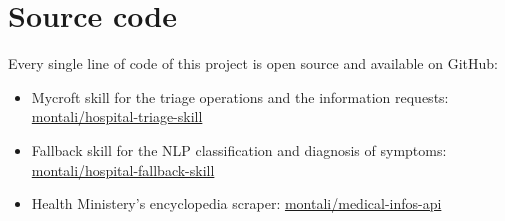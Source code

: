 \documentclass[conference]{IEEEtran}
\begin{document}
\section{Source code}
Every single line of code of this project is open source and available on GitHub:
\begin{itemize}
    \item Mycroft skill for the triage operations and the information requests: \href{https://github.com/montali/hospital-triage-skill}{montali/hospital-triage-skill}
    \item Fallback skill for the NLP classification and diagnosis of symptoms: \href{https://github.com/montali/hospital-fallback-skill}{montali/hospital-fallback-skill}
    \item Health Ministery's encyclopedia scraper: \href{https://github.com/montali/medical-infos-api}{montali/medical-infos-api}
\end{itemize}
\end{document}
